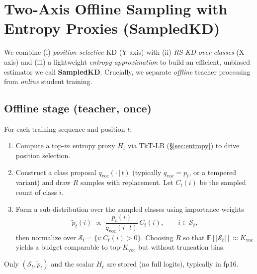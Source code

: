 \documentclass[11pt]{article}
\begin{document}
\section{Two-Axis Offline Sampling with Entropy Proxies (SampledKD)}
\label{sec:twoaxis}

We combine (i) \emph{position-selective} KD (Y axis) with (ii) \emph{RS-KD over classes} (X axis) and (iii) a lightweight \emph{entropy approximation} to build an efficient, unbiased estimator we call \textbf{SampledKD}.
Crucially, we separate \emph{offline} teacher processing from \emph{online} student training.

\subsection{Offline stage (teacher, once)}
For each training sequence and position $t$:
\begin{enumerate}
	\item Compute a top-$m$ entropy proxy $H_t$ via TkT-LB (\S\ref{sec:entropy}) to drive position selection.
	\item Construct a class proposal $q_{\text{voc}}(\cdot\,|\,t)$ (typically $q_{\text{voc}}\!=\!p_t$, or a tempered variant) and draw $R$ samples with replacement. Let $C_t(i)$ be the sampled count of class $i$.
	\item Form a sub-distribution over the sampled classes using importance weights
	      \[
		      \tilde p_t(i) \;\propto\; \frac{p_t(i)}{q_{\text{voc}}(i\,|\,t)} \, C_t(i),
		      \qquad i \in \mathcal{S}_t,
	      \]
	      then normalize over $\mathcal{S}_t=\{i: C_t(i)>0\}$. Choosing $R$ so that $\mathbb{E}[|\mathcal{S}_t|]\!\approx\!K_{\text{voc}}$ yields a budget comparable to top-$K_{\text{voc}}$ but without truncation bias.
\end{enumerate}
Only $(\mathcal{S}_t, \tilde p_t)$ and the scalar $H_t$ are stored (no full logits), typically in fp16.
\end{document}
